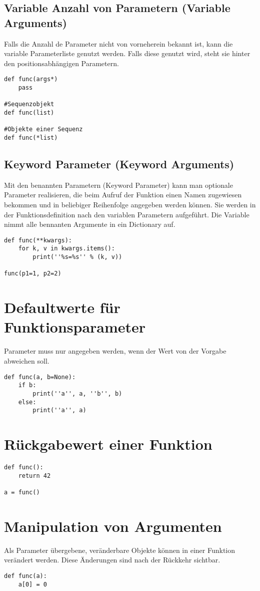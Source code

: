 \subsection{Variable Anzahl von Parametern (Variable Arguments)}
Falls die Anzahl de Parameter nicht von vorneherein bekannt ist, kann die variable Parameterliste genutzt werden. Falls diese genutzt wird, steht sie hinter den positionsabhängigen Parametern.
\begin{lstlisting}
def func(args*)
    pass
    
#Sequenzobjekt
def func(list)

#Objekte einer Sequenz
def func(*list)
\end{lstlisting}
\subsection{Keyword Parameter (Keyword Arguments)}
Mit den benannten Parametern (Keyword Parameter) kann man optionale Parameter realisieren, die beim Aufruf der Funktion einen Namen zugewiesen bekommen und in beliebiger Reihenfolge angegeben werden können. Sie werden in der Funktionsdefinition nach den variablen Parametern aufgeführt. Die Variable nimmt alle bennanten Argumente in ein Dictionary auf.
\begin{lstlisting}
def func(**kwargs):
    for k, v in kwargs.items():
        print(''%s=%s'' % (k, v))
        
func(p1=1, p2=2)
\end{lstlisting}
\section{Defaultwerte für Funktionsparameter}
Parameter muss nur angegeben werden, wenn der Wert von der Vorgabe abweichen soll.
\begin{lstlisting}
def func(a, b=None):
    if b:
        print(''a'', a, ''b'', b)
    else:
        print(''a'', a)
\end{lstlisting}
\section{Rückgabewert einer Funktion}
\begin{lstlisting}
def func():
    return 42

a = func()
\end{lstlisting}
\section{Manipulation von Argumenten}
Als Parameter übergebene, veränderbare Objekte können in einer Funktion verändert werden. Diese Änderungen sind nach der Rückkehr sichtbar.
\begin{lstlisting}
def func(a):
    a[0] = 0
\end{lstlisting}
